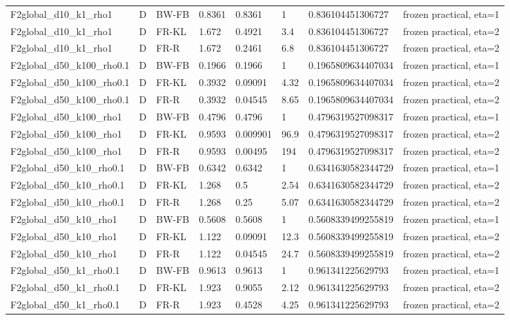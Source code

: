 \begin{tabular}{llllllll}
F2global\_d10\_k1\_rho1 & D & BW-FB & 0.8361 & 0.8361 & 1 & 0.836104451306727 & frozen practical, eta=1 \\
F2global\_d10\_k1\_rho1 & D & FR-KL & 1.672 & 0.4921 & 3.4 & 0.836104451306727 & frozen practical, eta=2 \\
F2global\_d10\_k1\_rho1 & D & FR-R & 1.672 & 0.2461 & 6.8 & 0.836104451306727 & frozen practical, eta=2 \\
F2global\_d50\_k100\_rho0.1 & D & BW-FB & 0.1966 & 0.1966 & 1 & 0.1965809634407034 & frozen practical, eta=1 \\
F2global\_d50\_k100\_rho0.1 & D & FR-KL & 0.3932 & 0.09091 & 4.32 & 0.1965809634407034 & frozen practical, eta=2 \\
F2global\_d50\_k100\_rho0.1 & D & FR-R & 0.3932 & 0.04545 & 8.65 & 0.1965809634407034 & frozen practical, eta=2 \\
F2global\_d50\_k100\_rho1 & D & BW-FB & 0.4796 & 0.4796 & 1 & 0.4796319527098317 & frozen practical, eta=1 \\
F2global\_d50\_k100\_rho1 & D & FR-KL & 0.9593 & 0.009901 & 96.9 & 0.4796319527098317 & frozen practical, eta=2 \\
F2global\_d50\_k100\_rho1 & D & FR-R & 0.9593 & 0.00495 & 194 & 0.4796319527098317 & frozen practical, eta=2 \\
F2global\_d50\_k10\_rho0.1 & D & BW-FB & 0.6342 & 0.6342 & 1 & 0.6341630582344729 & frozen practical, eta=1 \\
F2global\_d50\_k10\_rho0.1 & D & FR-KL & 1.268 & 0.5 & 2.54 & 0.6341630582344729 & frozen practical, eta=2 \\
F2global\_d50\_k10\_rho0.1 & D & FR-R & 1.268 & 0.25 & 5.07 & 0.6341630582344729 & frozen practical, eta=2 \\
F2global\_d50\_k10\_rho1 & D & BW-FB & 0.5608 & 0.5608 & 1 & 0.5608339499255819 & frozen practical, eta=1 \\
F2global\_d50\_k10\_rho1 & D & FR-KL & 1.122 & 0.09091 & 12.3 & 0.5608339499255819 & frozen practical, eta=2 \\
F2global\_d50\_k10\_rho1 & D & FR-R & 1.122 & 0.04545 & 24.7 & 0.5608339499255819 & frozen practical, eta=2 \\
F2global\_d50\_k1\_rho0.1 & D & BW-FB & 0.9613 & 0.9613 & 1 & 0.961341225629793 & frozen practical, eta=1 \\
F2global\_d50\_k1\_rho0.1 & D & FR-KL & 1.923 & 0.9055 & 2.12 & 0.961341225629793 & frozen practical, eta=2 \\
F2global\_d50\_k1\_rho0.1 & D & FR-R & 1.923 & 0.4528 & 4.25 & 0.961341225629793 & frozen practical, eta=2 \\

\end{tabular}
